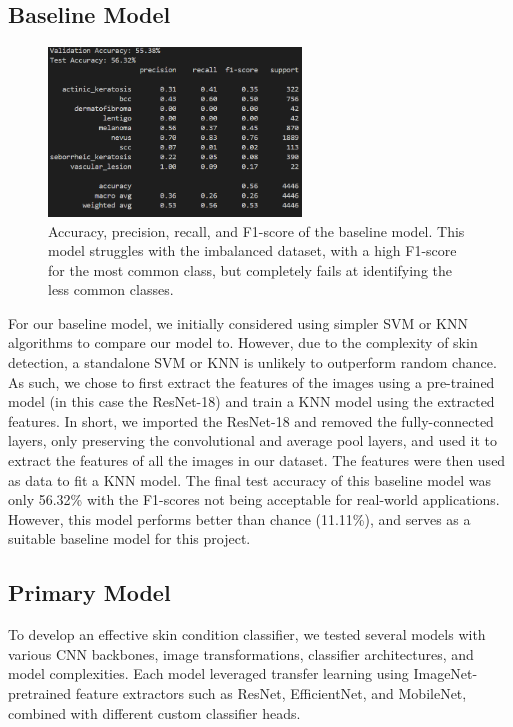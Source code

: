 \documentclass{article} %
\begin{document}
\subsection{Baseline Model}

\begin{figure}[H]
\begin{center}
\includegraphics[width=0.6\textwidth]{Figs/baseline_performance.png}
\end{center}
\caption{Accuracy, precision, recall, and F1-score of the baseline model. This model struggles with the imbalanced dataset, with a high F1-score for the most common class, but completely fails at identifying the less common classes.}
\end{figure}


For our baseline model, we initially considered using simpler SVM or KNN algorithms to compare our model to. However, due to the complexity of skin detection, a standalone SVM or KNN is unlikely to outperform random chance. As such, we chose to first extract the features of the images using a pre-trained model (in this case the ResNet-18) and train a KNN model using the extracted features. In short, we imported the ResNet-18 and removed the fully-connected layers, only preserving the convolutional and average pool layers, and used it to extract the features of all the images in our dataset. The features were then used as data to fit a KNN model. The final test accuracy of this baseline model was only 56.32\% with the F1-scores not being acceptable for real-world applications. However, this model performs better than chance (11.11\%), and serves as a suitable baseline model for this project.


\subsection{Primary Model}

To develop an effective skin condition classifier, we tested several models with various CNN backbones, image transformations, classifier architectures, and model complexities. Each model leveraged transfer learning using ImageNet-pretrained feature extractors such as ResNet, EfficientNet, and MobileNet, combined with different custom classifier heads.
\end{document}

